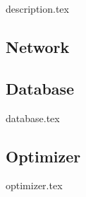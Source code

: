 {description.tex}

\subsection{Network} \label{sec:NN}
\newpage

\subsection{Database} \label{sec:DB}
{database.tex}
\newpage

\subsection{Optimizer} \label{sec:opt}
{optimizer.tex}
\newpage
